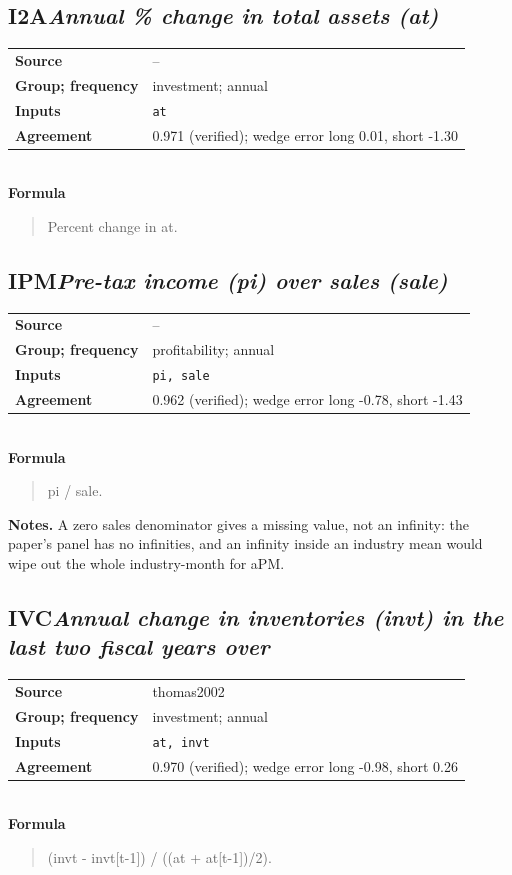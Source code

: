 \documentclass[11pt]{article}
\begin{document}
\subsection*{I2A\quad\normalfont\itshape Annual \% change in total assets (at)}
\begin{tabular}{@{}p{3.3cm}p{12.3cm}@{}}
\textbf{Source} & --\\
\textbf{Group; frequency} & investment; annual\\
\textbf{Inputs} & \texttt{at}\\
\textbf{Agreement} & 0.971 (verified); wedge error long 0.01, short -1.30\\
\end{tabular}\\[4pt]
\textbf{Formula}
\begin{quote}\small
Percent change in at.\\

\end{quote}
\subsection*{IPM\quad\normalfont\itshape Pre-tax income (pi) over sales (sale)}
\begin{tabular}{@{}p{3.3cm}p{12.3cm}@{}}
\textbf{Source} & --\\
\textbf{Group; frequency} & profitability; annual\\
\textbf{Inputs} & \texttt{pi, sale}\\
\textbf{Agreement} & 0.962 (verified); wedge error long -0.78, short -1.43\\
\end{tabular}\\[4pt]
\textbf{Formula}
\begin{quote}\small
pi / sale.\\

\end{quote}
\textbf{Notes.} A zero sales denominator gives a missing value, not an infinity: the paper's panel has no infinities, and an infinity inside an industry mean would wipe out the whole industry-month for aPM.

\subsection*{IVC\quad\normalfont\itshape Annual change in inventories (invt) in the last two fiscal years over}
\begin{tabular}{@{}p{3.3cm}p{12.3cm}@{}}
\textbf{Source} & thomas2002\\
\textbf{Group; frequency} & investment; annual\\
\textbf{Inputs} & \texttt{at, invt}\\
\textbf{Agreement} & 0.970 (verified); wedge error long -0.98, short 0.26\\
\end{tabular}\\[4pt]
\textbf{Formula}
\begin{quote}\small
(invt - invt[t-1]) / ((at + at[t-1])/2).\\

\end{quote}
\end{document}
